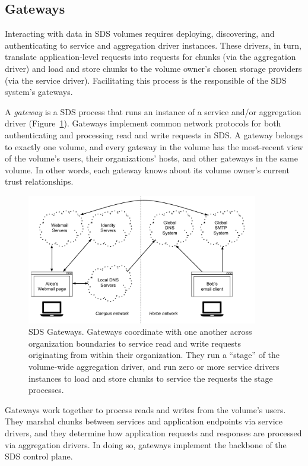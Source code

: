 \subsection{Gateways}

Interacting with data in SDS volumes requires deploying, discovering,
and authenticating to service and aggregation driver instances.  These drivers,
in turn, translate application-level requests into requests for chunks (via the
aggregation driver) and load and store chunks to the volume owner's chosen
storage providers (via the service driver).  Facilitating this process
is the responsible of the SDS system's gateways.

A \emph{gateway} is a SDS process that runs an instance of a service and/or
aggregation driver (Figure~\ref{fig:chap2-gateways}).
Gateways implement common network protocols for both
authenticating and processing read and write requests in SDS.  A gateway belongs
to exactly one volume, and every gateway in the volume has the most-recent
view of the volume's users, their organizations' hosts, and other gateways in
the same volume.  In other words, each gateway knows about its volume owner's current trust
relationships.

\begin{figure}[h]
   \centering
   \includegraphics[width=0.9\textwidth,page=6]{figures/dissertation-figures}
   \caption{SDS Gateways.  Gateways coordinate with one another across
   organization boundaries to service read and write requests originating from
   within their organization.  They run a ``stage'' of the volume-wide aggregation driver,
   and run zero or more service drivers instances to load and store chunks to
   service the requests the stage processes.}
   \label{fig:chap2-gateways}
\end{figure}

Gateways work together to process reads and writes from the volume's users.
They marshal chunks between services and application endpoints via service
drivers, and they determine how application requests and responses are processed
via aggregation drivers.  In doing so, gateways implement the backbone of
the SDS control plane.

